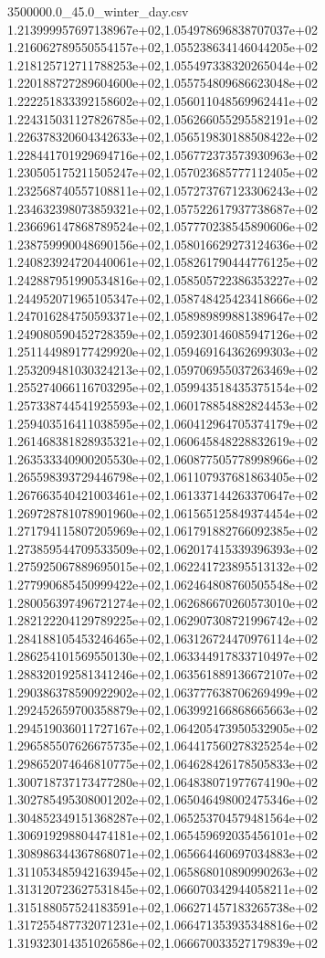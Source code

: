 \begin{filecontents*}{3500000.0_45.0_winter_day.csv}
1.213999957697138967e+02,1.054978696838707037e+02
1.216062789550554157e+02,1.055238634146044205e+02
1.218125712711788253e+02,1.055497338320265044e+02
1.220188727289604600e+02,1.055754809686623048e+02
1.222251833392158602e+02,1.056011048569962441e+02
1.224315031127826785e+02,1.056266055295582191e+02
1.226378320604342633e+02,1.056519830188508422e+02
1.228441701929694716e+02,1.056772373573930963e+02
1.230505175211505247e+02,1.057023685777112405e+02
1.232568740557108811e+02,1.057273767123306243e+02
1.234632398073859321e+02,1.057522617937738687e+02
1.236696147868789524e+02,1.057770238545890606e+02
1.238759990048690156e+02,1.058016629273124636e+02
1.240823924720440061e+02,1.058261790444776125e+02
1.242887951990534816e+02,1.058505722386353227e+02
1.244952071965105347e+02,1.058748425423418666e+02
1.247016284750593371e+02,1.058989899881389647e+02
1.249080590452728359e+02,1.059230146085947126e+02
1.251144989177429920e+02,1.059469164362699303e+02
1.253209481030324213e+02,1.059706955037263469e+02
1.255274066116703295e+02,1.059943518435375154e+02
1.257338744541925593e+02,1.060178854882824453e+02
1.259403516411038595e+02,1.060412964705374179e+02
1.261468381828935321e+02,1.060645848228832619e+02
1.263533340900205530e+02,1.060877505778998966e+02
1.265598393729446798e+02,1.061107937681863405e+02
1.267663540421003461e+02,1.061337144263370647e+02
1.269728781078901960e+02,1.061565125849374454e+02
1.271794115807205969e+02,1.061791882766092385e+02
1.273859544709533509e+02,1.062017415339396393e+02
1.275925067889695015e+02,1.062241723895513132e+02
1.277990685450999422e+02,1.062464808760505548e+02
1.280056397496721274e+02,1.062686670260573010e+02
1.282122204129789225e+02,1.062907308721996742e+02
1.284188105453246465e+02,1.063126724470976114e+02
1.286254101569550130e+02,1.063344917833710497e+02
1.288320192581341246e+02,1.063561889136672107e+02
1.290386378590922902e+02,1.063777638706269499e+02
1.292452659700358879e+02,1.063992166868665663e+02
1.294519036011727167e+02,1.064205473950532905e+02
1.296585507626675735e+02,1.064417560278325254e+02
1.298652074646810775e+02,1.064628426178505833e+02
1.300718737173477280e+02,1.064838071977674190e+02
1.302785495308001202e+02,1.065046498002475346e+02
1.304852349151368287e+02,1.065253704579481564e+02
1.306919298804474181e+02,1.065459692035456101e+02
1.308986344367868071e+02,1.065664460697034883e+02
1.311053485942163945e+02,1.065868010890990263e+02
1.313120723627531845e+02,1.066070342944058211e+02
1.315188057524183591e+02,1.066271457183265738e+02
1.317255487732071231e+02,1.066471353935348816e+02
1.319323014351026586e+02,1.066670033527179839e+02

\end{filecontents*}
